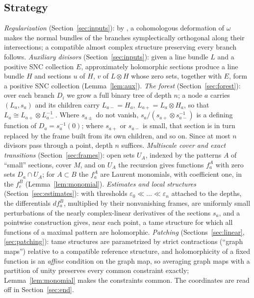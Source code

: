 \documentclass[12pt]{article}
\theoremstyle{remark}
\newcommand{\eps}{\varepsilon}
\begin{document}
\subsection*{Strategy}

\emph{Regularization} (Section~\ref{sec:inputs}): by
\cite[Theorem 2.13]{FMZ}, a cohomologous deformation of $\omega$ makes
the normal bundles of the branches symplectically orthogonal along
their intersections; a compatible almost complex structure preserving
every branch follows.
\emph{Auxiliary divisors} (Section~\ref{sec:inputs}): given a line
bundle $L$ and a positive SNC collection $E$, approximately holomorphic
sections \cite{Donaldson1996,Auroux1997,Mohsen2019} produce a line
bundle $H$ and sections $u$ of $H$, $v$ of $L\otimes H$ whose zero sets,
together with $E$, form a positive SNC collection (Lemma~\ref{lem:aux}).
\emph{The forest} (Section~\ref{sec:forest}): over each branch $D_i$ we
grow a full binary tree of depth $n$; a node $a$ carries $(L_a,s_a)$ and
its children carry $L_{a-}=H_a$, $L_{a+}=L_a\otimes H_a$, so that
$L_a\cong L_{a+}\otimes L_{a-}^{-1}$. Where $s_{a\pm}$ do not vanish,
$s_a/(s_{a+}\otimes s_{a-}^{-1})$ is a defining function of
$D_a=s_a^{-1}(0)$; where $s_{a+}$ or $s_{a-}$ is small, that section is
in turn replaced by the frame built from its own children, and so on.
Since at most $n$ divisors pass
through a point, depth $n$ suffices.
\emph{Multiscale cover and exact transitions} (Section~\ref{sec:frames}):
open sets $U_A$, indexed by the patterns $A$ of ``small'' sections,
cover $M$, and on $U_A$ the recursion gives functions $f^A_a$ with zero
sets $D_a\cap U_A$; for $A\subset B$ the $f^A_a$ are Laurent monomials,
with coefficient one, in the $f^B_c$ (Lemma~\ref{lem:monomial}).
\emph{Estimates and local structures} (Section~\ref{sec:estimates}):
with thresholds $\eps_0\ll\dots\ll\eps_n$ attached to the depths, the
differentials $df^B_a$, multiplied by their nonvanishing frames, are
uniformly small perturbations of the nearly complex-linear derivatives
of the sections $s_a$, and a pointwise construction gives, near each
point, a tame structure for which all functions of a maximal pattern
are holomorphic.
\emph{Patching} (Sections~\ref{sec:linear}, \ref{sec:patching}): tame
structures are parametrized by strict contractions (``graph maps'')
relative to a compatible reference structure, and holomorphicity of a fixed
function is an \emph{affine} condition on the graph map, so averaging
graph maps with a partition of unity preserves every common constraint
exactly; Lemma~\ref{lem:monomial} makes the constraints common. The
coordinates are read off in Section~\ref{sec:end}.
\end{document}
